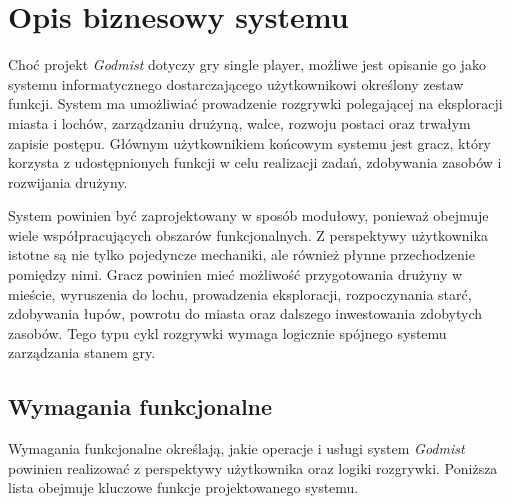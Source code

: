 \section{Opis biznesowy systemu}
\label{sec:opis-biznesowy}

Choć projekt \emph{Godmist} dotyczy gry single player, możliwe jest opisanie go jako systemu informatycznego dostarczającego użytkownikowi określony zestaw funkcji. System ma umożliwiać prowadzenie rozgrywki polegającej na eksploracji miasta i lochów, zarządzaniu drużyną, walce, rozwoju postaci oraz trwałym zapisie postępu. Głównym użytkownikiem końcowym systemu jest gracz, który korzysta z udostępnionych funkcji w celu realizacji zadań, zdobywania zasobów i rozwijania drużyny.

System powinien być zaprojektowany w sposób modułowy, ponieważ obejmuje wiele współpracujących obszarów funkcjonalnych. Z perspektywy użytkownika istotne są nie tylko pojedyncze mechaniki, ale również płynne przechodzenie pomiędzy nimi. Gracz powinien mieć możliwość przygotowania drużyny w mieście, wyruszenia do lochu, prowadzenia eksploracji, rozpoczynania starć, zdobywania łupów, powrotu do miasta oraz dalszego inwestowania zdobytych zasobów. Tego typu cykl rozgrywki wymaga logicznie spójnego systemu zarządzania stanem gry.

\subsection{Wymagania funkcjonalne}
\label{subsec:wymagania-funkcjonalne}

Wymagania funkcjonalne określają, jakie operacje i usługi system \emph{Godmist} powinien realizować z perspektywy użytkownika oraz logiki rozgrywki. Poniższa lista obejmuje kluczowe funkcje projektowanego systemu.

